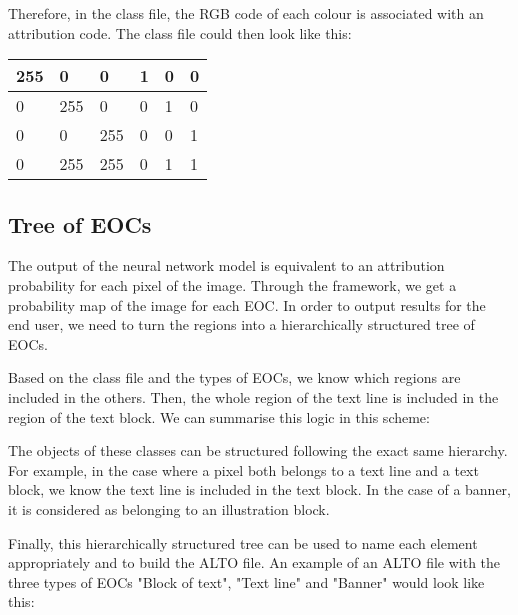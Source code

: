 \documentclass{polytech/polytech}
\numberwithin{figure}{chapter}
\begin{document}
Therefore, in the class file, the RGB code of each colour is associated with an attribution code.
The class file could then look like this:
\begin{table}[]
\begin{tabular}{|llllll|}\hline
255 & 0 & 0 & 1 & 0 & 0\\\hline
0 & 255 & 0 & 0 & 1 & 0 \\\hline
0 & 0  & 255 & 0 & 0 & 1 \\\hline
0 & 255  &255 & 0 & 1 & 1 \\\hline
\end{tabular}
\end{table}


\subsection{Tree of EOCs}

The output of the neural network model is equivalent to an attribution probability for each pixel of the image.
Through the framework, we get a probability map of the image for each EOC.
In order to output results for the end user, we need to turn the regions into a hierarchically structured tree of EOCs.

Based on the class file and the types of EOCs, we know which regions are included in the others.
Then, the whole region of the text line is included in the region of the text block.
We can summarise this logic in this scheme:

\label{EOCdiag}

The objects of these classes can be structured following the exact same hierarchy.
For example, in the case where a pixel both belongs to a text line and a text block, we know the text line is included in the text block. In the case of a banner, it is considered as belonging to an illustration block.

Finally, this hierarchically structured tree can be used to name each element appropriately and to build the ALTO file.
An example of an ALTO file with the three types of EOCs "Block of text", "Text line" and "Banner" would look like this:
\end{document}
